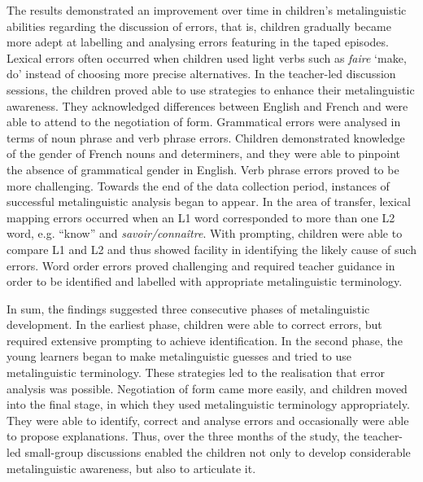 \documentclass[output=paper]{langscibook}
\begin{document}
The results demonstrated an improvement over time in children’s metalinguistic abilities regarding the discussion of errors, that is, children gradually became more adept at labelling and analysing errors featuring in the taped episodes. Lexical errors often occurred when children used light verbs such as \textit{faire} `make, do' instead of choosing more precise alternatives. In the teacher-led discussion sessions, the children proved able to use strategies to enhance their metalinguistic awareness. They acknowledged differences between English and French and were able to attend to the negotiation of form. Grammatical errors were analysed in terms of noun phrase and verb phrase errors. Children demonstrated knowledge of the gender of French nouns and determiners, and they were able to pinpoint the absence of grammatical gender in English. Verb phrase errors proved to be more challenging. Towards the end of the data collection period, instances of successful metalinguistic analysis began to appear. In the area of transfer, lexical mapping errors occurred when an L1 word corresponded to more than one L2 word, e.g. ``know'' and \textit{savoir/connaître}. With prompting, children were able to compare L1 and L2 and thus showed facility in identifying the likely cause of such errors. Word order errors proved challenging and required teacher guidance in order to be identified and labelled with appropriate metalinguistic terminology. 

In sum, the findings suggested three consecutive phases of metalinguistic development. In the earliest phase, children were able to correct errors, but required extensive prompting to achieve identification. In the second phase, the young learners began to make metalinguistic guesses and tried to use metalinguistic terminology. These strategies led to the realisation that error analysis was possible. Negotiation of form came more easily, and children moved into the final stage, in which they used metalinguistic terminology appropriately. They were able to identify, correct and analyse errors and occasionally were able to propose explanations. Thus, over the three months of the study, the teacher-led small-group discussions enabled the children not only to develop considerable metalinguistic awareness, but also to articulate it. 
\end{document}
